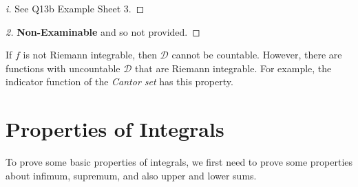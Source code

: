 \documentclass[../main.tex]{subfiles}
\begin{document}
\begin{proof}[i]
  See Q13b Example Sheet 3.
\end{proof}
\begin{proof}[2]
  \textbf{Non-Examinable} and so not provided.
\end{proof}
\begin{remark}[Warning]
  If $f$ is not Riemann integrable, then $\mathcal{D}$ cannot be countable.
  However, there are functions with uncountable $\mathcal{D}$ that are Riemann integrable.
  For example, the indicator function of the \textit{Cantor set} has this property.
\end{remark}
\section{Properties of Integrals}
To prove some basic properties of integrals, we first need to prove some properties about infimum, supremum, and also upper and lower sums.
\end{document}
